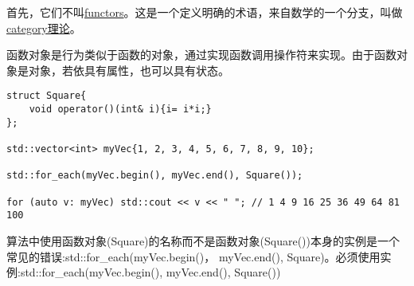 首先，它们不叫\href{https://en.wikipedia.org/wiki/Functor}{functors}。这是一个定义明确的术语，来自数学的一个分支，叫做\href{https://en.wikipedia.org/wiki/Category_theory}{category理论}。

函数对象是行为类似于函数的对象，通过实现函数调用操作符来实现。由于函数对象是对象，若依具有属性，也可以具有状态。

\begin{lstlisting}[style=styleCXX]
struct Square{
	void operator()(int& i){i= i*i;}
};

std::vector<int> myVec{1, 2, 3, 4, 5, 6, 7, 8, 9, 10};

std::for_each(myVec.begin(), myVec.end(), Square());

for (auto v: myVec) std::cout << v << " "; // 1 4 9 16 25 36 49 64 81 100
\end{lstlisting}

\begin{tcolorbox}[breakable,enhanced jigsaw,colback=blue!5!white,colframe=blue!75!black,title={实例化函数对象}]
算法中使用函数对象(Square)的名称而不是函数对象(Square())本身的实例是一个常见的错误:std::for\_each(myVec.begin()， myVec.end(), Square)。必须使用实例:std::for\_each(myVec.begin(), myVec.end(), Square())
\end{tcolorbox}